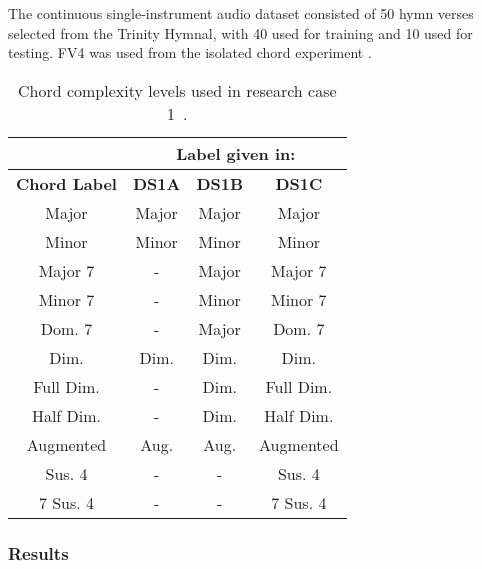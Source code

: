 \documentclass{sig-alternate}
\begin{document}
The continuous single-instrument audio dataset consisted of 50 hymn verses selected from the Trinity Hymnal, with 40 used for training and 10 used for testing. FV4 was used from the isolated chord experiment \cite{Morman:2006}.



\begin{table}
\centering
\begin{tabular}{|c|c|c|c|} \hline
&\multicolumn{3}{|c|}{\textbf{Label given in:}} \\ \hline
\textbf{Chord Label} & \textbf{DS1A} & \textbf{DS1B} & \textbf{DS1C} \\ \hline
Major & Major & Major & Major \\ \hline
Minor & Minor & Minor & Minor \\ \hline
Major 7 & - & Major & Major 7 \\ \hline
Minor 7 & - & Minor & Minor 7 \\ \hline
Dom. 7 & - & Major & Dom. 7 \\ \hline
Dim. & Dim. & Dim. & Dim. \\ \hline
Full Dim. & - & Dim. & Full Dim. \\ \hline
Half Dim. & - & Dim. & Half Dim. \\ \hline
Augmented & Aug. & Aug. & Augmented \\ \hline
Sus. 4 & - & - & Sus. 4 \\ \hline
7 Sus. 4 & - & - & 7 Sus. 4 \\ \hline
\end{tabular}
\caption{Chord complexity levels used in research case 1~\cite{Morman:2006}.}
\label{tab:tab1}
\end{table} 



\subsubsection{Results}
\end{document}
